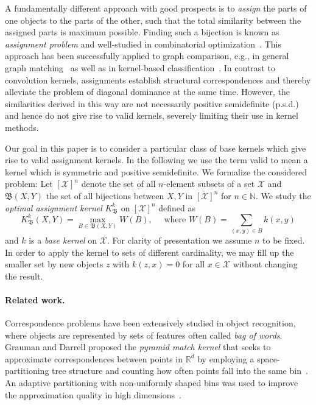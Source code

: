 \documentclass{article}
\newcommand{\X}{\ensuremath{\mathcal{X}}\xspace}
\newcommand{\bbN}[0]{\ensuremath{\mathbb{N}}\xspace}
\newcommand{\bbR}[0]{\ensuremath{\mathbb{R}}\xspace}
\newcommand{\Assign}{\ensuremath{\mathfrak{B}}\xspace}
\begin{document}
A fundamentally different approach with good prospects is to \emph{assign}
the parts of one objects to the parts of the other, such that the total 
similarity between the assigned parts is maximum possible. 
Finding such a bijection is known as \emph{assignment problem} and well-studied
in combinatorial optimization~\cite{Burkard2012}.
This approach has been successfully applied to graph comparison, e.g., in general 
graph matching~\cite{Gori2005,Riesen2009a} as well as in kernel-based
classification~\cite{Frohlich2005,Schiavinato2015,Bai2015}.
In contrast to convolution kernels, assignments establish structural 
correspondences and thereby alleviate the problem of diagonal dominance at the 
same time.
However, the similarities derived in this way are not necessarily positive 
semidefinite (p.s.d.)~\cite{Vert2008,Vishwanathan2010} and hence do not give 
rise to valid kernels, severely limiting their use in kernel methods. 

Our goal in this paper is to consider a particular class of base kernels which 
give rise to valid assignment kernels. In the following we use the term valid to 
mean a kernel which is symmetric and positive semidefinite. 
We formalize the considered problem:
Let $[\X]^n$ denote the set of all $n$-element subsets of a set $\X$ and 
$\Assign(X,Y)$ the set of all bijections between $X,Y$ in $[\X]^n$ for 
$n \in \bbN$. 
We study the \emph{optimal assignment kernel} $K_\Assign^k$ on $[\X]^n$ defined as
\begin{equation}\label{eq:assignment_kernel}
 K_\Assign^k(X,Y) = \max_{B \in \Assign(X,Y)} W(B), \quad\text{ where } W(B) = \sum_{(x,y) \in B} k(x,y)
\end{equation}
and $k$ is a \emph{base kernel} on \X. 
For clarity of presentation we assume $n$ to be fixed. In order to apply the 
kernel to sets of different cardinality, we may fill up the smaller set by new 
objects $z$ with $k(z,x)=0$ for all $x \in \X$ without changing the result.


\paragraph{Related work.}
Correspondence problems have been extensively studied in object recognition, 
where objects are represented by sets of features often called \emph{bag of words}.
Grauman and Darrell proposed the \emph{pyramid match kernel} that seeks to
approximate correspondences between points in $\bbR^d$ by employing a 
space-partitioning tree structure and counting how often points fall into the 
same bin~\cite{Grauman2007}. An adaptive partitioning with non-uniformly shaped 
bins was used to improve the approximation quality in high dimensions~\cite{Grauman2007a}.
\end{document}

